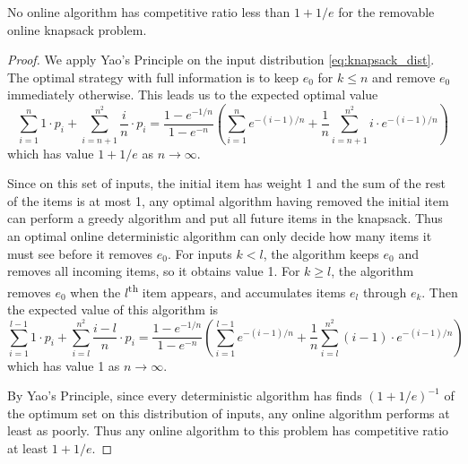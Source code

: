\begin{theorem}
	\emph{\cite{han}}
	No online algorithm has competitive ratio less than $1+1/e$ for the removable online knapsack problem.
\end{theorem}
\begin{proof}
	We apply Yao's Principle on the input distribution \eqref{eq:knapsack_dist}. The optimal strategy with full information is to keep $e_0$ for $k\le n$ and remove $e_0$ immediately otherwise. This leads us to the expected optimal value
	\[ \sum_{i=1}^n 1\cdot p_i + \sum_{i=n+1}^{n^2} \frac{i}{n}\cdot p_i = \frac{1-e^{-1/n}}{1-e^{-n}} \left( \sum_{i=1}^n e^{-(i-1)/n} + \frac{1}{n} \sum_{i=n+1}^{n^2} i\cdot e^{-(i-1)/n} \right) \]
	which has value $1+1/e$ as $n \rightarrow \infty$.

	Since on this set of inputs, the initial item has weight 1 and the sum of the rest of the items is at most 1, any optimal algorithm having removed the initial item can perform a greedy algorithm and put all future items in the knapsack. Thus an optimal online deterministic algorithm can only decide how many items it must see before it removes $e_0$. For inputs $k<l$, the algorithm keeps $e_0$ and removes all incoming items, so it obtains value 1. For $k\ge l$, the algorithm removes $e_0$ when the $l$\textsuperscript{th} item appears, and accumulates items $e_l$ through $e_k$. Then the expected value of this algorithm is
	\[ \sum_{i=1}^{l-1} 1\cdot p_i + \sum_{i=l}^{n^2} \frac{i-l}{n}\cdot p_i = \frac{1-e^{-1/n}}{1-e^{-n}} \left( \sum_{i=1}^{l-1} e^{-(i-1)/n} + \frac{1}{n} \sum_{i=l}^{n^2} (i-1)\cdot e^{-(i-1)/n} \right) \]
which has value 1 as $n \rightarrow \infty$.

By Yao's Principle, since every deterministic algorithm has finds $(1+1/e)^{-1}$ of the optimum set on this distribution of inputs, any online algorithm performs at least as poorly. Thus any online algorithm to this problem has competitive ratio at least $1+1/e$.
\end{proof}


